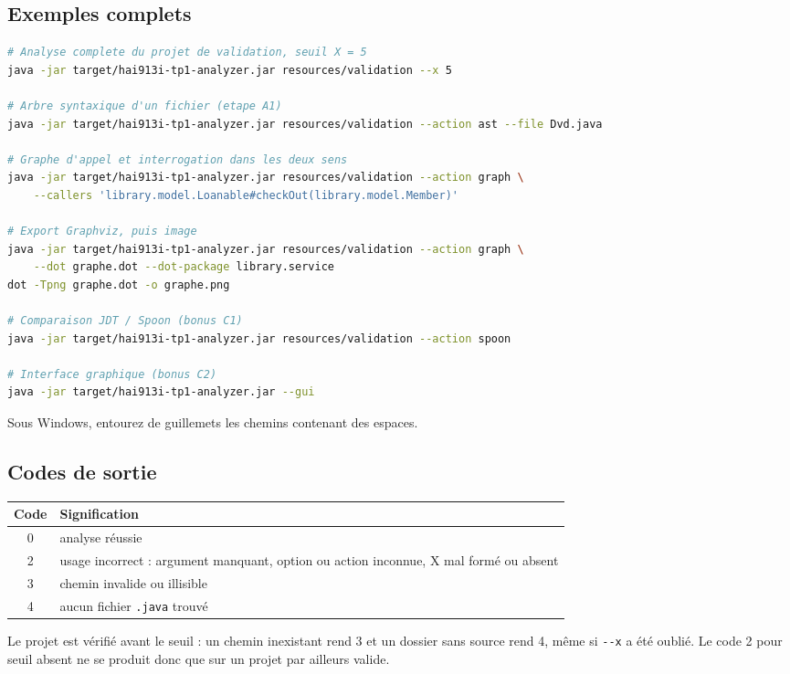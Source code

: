 \documentclass[11pt,a4paper]{article}
\begin{document}
\subsection*{Exemples complets}

\begin{lstlisting}[language=bash]
# Analyse complete du projet de validation, seuil X = 5
java -jar target/hai913i-tp1-analyzer.jar resources/validation --x 5

# Arbre syntaxique d'un fichier (etape A1)
java -jar target/hai913i-tp1-analyzer.jar resources/validation --action ast --file Dvd.java

# Graphe d'appel et interrogation dans les deux sens
java -jar target/hai913i-tp1-analyzer.jar resources/validation --action graph \
    --callers 'library.model.Loanable#checkOut(library.model.Member)'

# Export Graphviz, puis image
java -jar target/hai913i-tp1-analyzer.jar resources/validation --action graph \
    --dot graphe.dot --dot-package library.service
dot -Tpng graphe.dot -o graphe.png

# Comparaison JDT / Spoon (bonus C1)
java -jar target/hai913i-tp1-analyzer.jar resources/validation --action spoon

# Interface graphique (bonus C2)
java -jar target/hai913i-tp1-analyzer.jar --gui
\end{lstlisting}

Sous Windows, entourez de guillemets les chemins contenant des espaces.

\subsection*{Codes de sortie}

\begin{table}[H]
\centering
\begin{tabular}{@{}cl@{}}
\toprule
\textbf{Code} & \textbf{Signification} \\
\midrule
0 & analyse réussie \\
2 & usage incorrect : argument manquant, option ou action inconnue, X mal formé ou absent \\
3 & chemin invalide ou illisible \\
4 & aucun fichier \texttt{.java} trouvé \\
\bottomrule
\end{tabular}
\end{table}

Le projet est vérifié avant le seuil : un chemin inexistant rend 3 et un dossier sans source rend 4, même si \texttt{-{}-x} a été oublié. Le code 2 pour seuil absent ne se produit donc que sur un projet par ailleurs valide.
\end{document}
